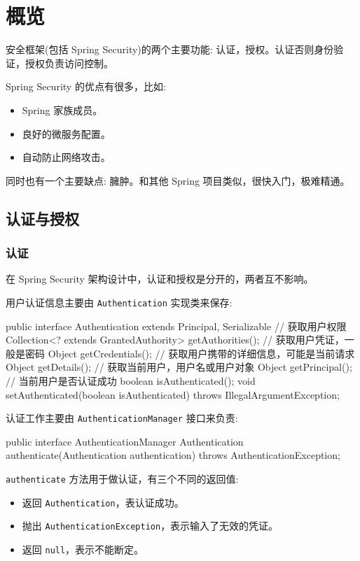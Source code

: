 \section{概览}

安全框架(包括 Spring Security)的两个主要功能: 认证，授权。认证否则身份验证，授权负责访问控制。

Spring Security 的优点有很多，比如:
\begin{itemize}
  \item Spring 家族成员。
  \item 良好的微服务配置。
  \item 自动防止网络攻击。
\end{itemize} 

同时也有一个主要缺点: 臃肿。和其他 Spring 项目类似，很快入门，极难精通。

\subsection{认证与授权}
\subsubsection*{认证}

在 Spring Security 架构设计中，认证和授权是分开的，两者互不影响。

用户认证信息主要由 \texttt{Authentication} 实现类来保存:

\begin{Java}
public interface Authentication extends Principal, Serializable {
    // 获取用户权限
    Collection<? extends GrantedAuthority> getAuthorities();
    // 获取用户凭证，一般是密码
    Object getCredentials();
    // 获取用户携带的详细信息，可能是当前请求
    Object getDetails();
    // 获取当前用户，用户名或用户对象
    Object getPrincipal();
    // 当前用户是否认证成功
    boolean isAuthenticated();
    void setAuthenticated(boolean isAuthenticated) throws IllegalArgumentException;
}
\end{Java}

认证工作主要由 \texttt{AuthenticationManager} 接口来负责:

\begin{Java}
public interface AuthenticationManager {
    Authentication authenticate(Authentication authentication) throws AuthenticationException;
}
\end{Java}

\texttt{authenticate} 方法用于做认证，有三个不同的返回值:
\begin{itemize}
  \item 返回 \texttt{Authentication}，表认证成功。
  \item 抛出 \texttt{AuthenticationException}，表示输入了无效的凭证。
  \item 返回 \texttt{null}，表示不能断定。
\end{itemize}

